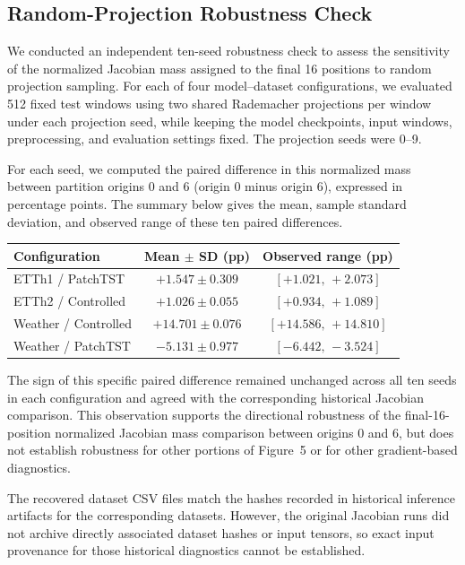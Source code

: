 \subsection{Random-Projection Robustness Check}\label{sec:projection-robustness}

We conducted an independent ten-seed robustness check to assess the sensitivity of the normalized Jacobian mass assigned to the final 16 positions to random projection sampling. For each of four model--dataset configurations, we evaluated 512 fixed test windows using two shared Rademacher projections per window under each projection seed, while keeping the model checkpoints, input windows, preprocessing, and evaluation settings fixed. The projection seeds were 0--9.

For each seed, we computed the paired difference in this normalized mass between partition origins 0 and 6 (origin 0 minus origin 6), expressed in percentage points. The summary below gives the mean, sample standard deviation, and observed range of these ten paired differences.

\begin{center}
\begin{tabular}{lcc}
\toprule
Configuration & Mean $\pm$ SD (pp) & Observed range (pp)\\
\midrule
ETTh1 / PatchTST & $+1.547 \pm 0.309$ & $[+1.021,\,+2.073]$\\
ETTh2 / Controlled & $+1.026 \pm 0.055$ & $[+0.934,\,+1.089]$\\
Weather / Controlled & $+14.701 \pm 0.076$ & $[+14.586,\,+14.810]$\\
Weather / PatchTST & $-5.131 \pm 0.977$ & $[-6.442,\,-3.524]$\\
\bottomrule
\end{tabular}
\end{center}

The sign of this specific paired difference remained unchanged across all ten seeds in each configuration and agreed with the corresponding historical Jacobian comparison. This observation supports the directional robustness of the final-16-position normalized Jacobian mass comparison between origins 0 and 6, but does not establish robustness for other portions of Figure~5 or for other gradient-based diagnostics.

The recovered dataset CSV files match the hashes recorded in historical inference artifacts for the corresponding datasets. However, the original Jacobian runs did not archive directly associated dataset hashes or input tensors, so exact input provenance for those historical diagnostics cannot be established.

